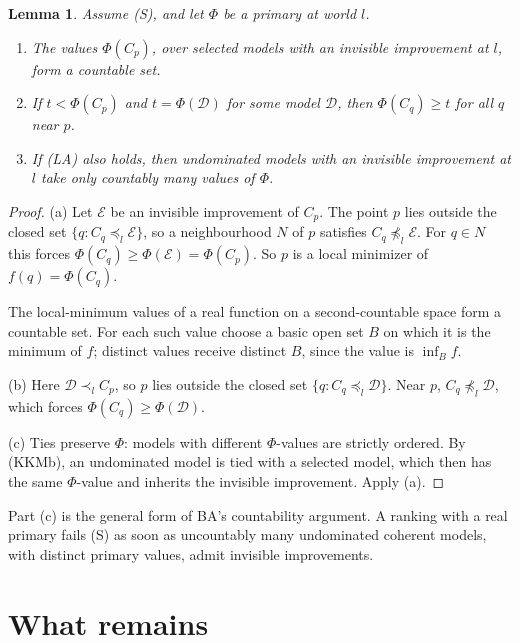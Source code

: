 \documentclass[11pt]{article}
\newtheorem{lemma}[theorem]{Lemma}
\theoremstyle{remark}\newtheorem{remark}[theorem]{Remark}
\newcommand{\Dscr}{\mathcal D}
\newcommand{\Escr}{\mathcal E}
\begin{document}
\begin{lemma}\label{lem:primary}
Assume (S), and let $\Phi$ be a primary at world $l$.
\begin{enumerate}[label=(\alph*)]
\item The values $\Phi(C_p)$, over selected models with an invisible
improvement at $l$, form a countable set.
\item If $t<\Phi(C_p)$ and $t=\Phi(\Dscr)$ for some model $\Dscr$, then
$\Phi(C_q)\ge t$ for all $q$ near $p$.
\item If (LA) also holds, then undominated models with an invisible
improvement at $l$ take only countably many values of $\Phi$.
\end{enumerate}
\end{lemma}
\begin{proof}
(a) Let $\Escr$ be an invisible improvement of $C_p$. The point $p$ lies
outside the closed set $\{q:C_q\preceq_l\Escr\}$, so a neighbourhood $N$ of $p$
satisfies $C_q\not\preceq_l\Escr$. For $q\in N$ this forces
$\Phi(C_q)\ge\Phi(\Escr)=\Phi(C_p)$. So $p$ is a local minimizer of
$f(q)=\Phi(C_q)$.

The local-minimum values of a real function on a second-countable space form
a countable set. For each such value choose a basic open set $B$ on which it
is the minimum of $f$; distinct values receive distinct $B$, since the value
is $\inf_Bf$.

(b) Here $\Dscr\prec_lC_p$, so $p$ lies outside the closed set
$\{q:C_q\preceq_l\Dscr\}$. Near $p$, $C_q\not\preceq_l\Dscr$, which forces
$\Phi(C_q)\ge\Phi(\Dscr)$.

(c) Ties preserve $\Phi$: models with different $\Phi$-values are strictly
ordered. By (KKMb), an undominated model is tied with a selected model,
which then has the same $\Phi$-value and inherits the invisible improvement.
Apply (a).
\end{proof}

Part (c) is the general form of BA's countability argument. A ranking with a
real primary fails (S) as soon as uncountably many undominated coherent
models, with distinct primary values, admit invisible improvements.

\section{What remains}\label{sec:remaining}
\end{document}
